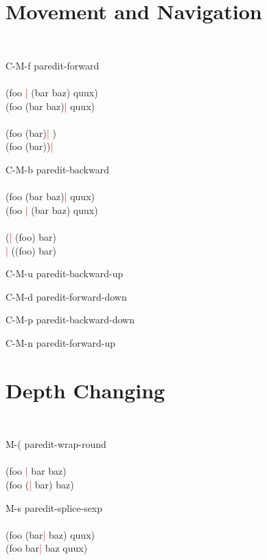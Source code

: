 \documentclass[8pt,a4paper,landscape]{extarticle}
\newcommand{\csr}{\textcolor{red}{| }}
\begin{document}
\begin{multicols}{4}
\section{Movement and Navigation}
\begin{eqlist}
  \tt
\item[C-M-f] paredit-forward\\
  \\
  (foo \csr (bar baz) quux)\\
  (foo (bar baz)\csr  quux)\\
  \\
  (foo (bar)\csr )\\
  (foo (bar))\csr \\


\item[C-M-b] paredit-backward\\
  \\
  (foo (bar baz)\csr  quux)\\
  (foo \csr (bar baz) quux)\\
  \\
  (\csr (foo) bar)\\
  \csr ((foo) bar)\\

\item[C-M-u] paredit-backward-up
\item[C-M-d] paredit-forward-down
\item[C-M-p] paredit-backward-down
\item[C-M-n] paredit-forward-up

\end{eqlist}

\section{Depth Changing}
\begin{eqlist}
  \tt
\item[M-(] paredit-wrap-round\\
  \\
  (foo \csr bar baz)\\
  (foo (\csr bar) baz)\\


\item[M-s] paredit-splice-sexp\\
  \\
  (foo (bar\csr  baz) quux)\\
  (foo bar\csr  baz quux)\\



\end{eqlist}
\end{multicols}
\end{document}
